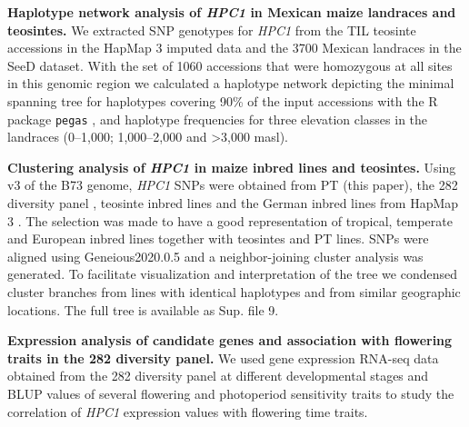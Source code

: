 \documentclass[9pt,twocolumn,twoside,lineno]{biorxiv}
\def\code#1{\texttt{#1}}
\begin{document}
\textbf{Haplotype network analysis of \textit{HPC1} in Mexican maize landraces and teosintes.}
We extracted SNP genotypes for \textit{HPC1} from the TIL teosinte accessions in the HapMap 3 imputed data \cite{Bukowski2017-ng} and the 3700 Mexican landraces in the SeeD dataset. 
With the set of 1060 accessions that were homozygous at all sites in this genomic region we calculated a haplotype network depicting the minimal spanning tree for haplotypes covering 90\% of the input accessions with the R package \code{pegas} \cite{paradis2010}, and haplotype frequencies for three elevation classes in the landraces (0--1,000; 1,000--2,000 and >3,000 masl).

\textbf{Clustering analysis of \textit{HPC1} in maize inbred lines and teosintes.}
Using v3 of the B73 genome, \textit{HPC1} SNPs were obtained from PT (this paper), the 282 diversity panel \cite{Flint-Garcia2005-hb}, teosinte inbred lines and the German inbred lines from HapMap 3 \cite{Bukowski2017-ng}. 
The selection was made to have a good representation of tropical, temperate and European inbred lines together with teosintes and PT lines.
SNPs were aligned using Geneious2020.0.5 and a neighbor-joining cluster analysis was generated. 
To facilitate visualization and interpretation of the tree we condensed cluster branches from lines with identical haplotypes and from similar geographic locations. 
The full tree is available as Sup. file 9. 

\textbf{Expression analysis of candidate genes and association with flowering traits in the 282 diversity panel.}
We used gene expression RNA-seq data obtained from the 282 diversity panel at different developmental stages \cite{Kremling2018-gn} and BLUP values of several flowering and photoperiod sensitivity traits \cite{Hung2012-ms} to study the correlation of \textit{HPC1} expression values with flowering time traits.  
\end{document}

